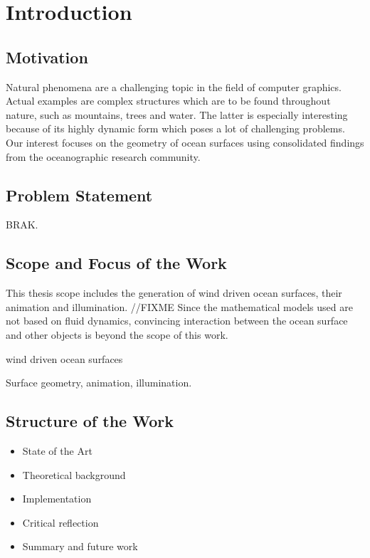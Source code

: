 \chapter{Introduction}
\label{ch:intro}
%
\section{Motivation}
\label{sec:motivation}

Natural phenomena are a challenging topic in the field of computer graphics.
Actual examples are complex structures which are to be found throughout nature,
such as mountains, trees and water. The latter is especially interesting
because of its highly dynamic form which poses a lot of challenging problems.
Our interest focuses on the geometry of ocean surfaces using
consolidated findings from the oceanographic research community.

\section{Problem Statement}
\label{sec:problem_statement}

BRAK.

\section{Scope and Focus of the Work}
\label{sec:scope_and_focus}

This thesis scope includes the generation of wind driven ocean surfaces, their
animation and illumination. //FIXME
Since the mathematical models used are not based on fluid dynamics,
convincing interaction between the ocean surface and other objects is beyond the
scope of this work.

wind driven ocean surfaces

Surface geometry, animation, illumination.

\section{Structure of the Work}
\label{sec:structure}

\begin{itemize}

\item State of the Art
\item Theoretical background
\item Implementation
\item Critical reflection
\item Summary and future work

\end{itemize}
